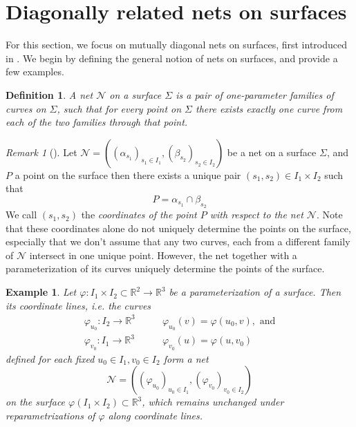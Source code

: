 \documentclass[10pt, a4paper]{article}
\theoremstyle{BoldTopSpacing}
\theoremstyle{BoldTopSpacing}
\theoremstyle{BoldTopSpacing}
\theoremstyle{BoldTopBottomSpacing}
\newtheorem{definition}{Definition}[section]
\theoremstyle{BoldTopSpacing}
\theoremstyle{BoldTopBottomSpacing}
\newtheorem{example}{Example}[section]
\theoremstyle{remark}
\newtheorem{remark}{\textit{Remark}}[section]
\begin{document}
\section{Diagonally related nets on surfaces}
\label{sec:diagonally-related-nets}

For this section, we focus on mutually diagonal nets on surfaces, first introduced in \cite{MutuallyDiagonalNets2019}. We begin by defining the general notion of nets on surfaces, and provide a few examples.

\begin{definition}
\label{def:nets-on-surfaces}
A net $\mathcal{N}$ on a surface $\Sigma$ is a pair of one-parameter families of curves on $\Sigma$, such that for every point on $\Sigma$ there exists exactly one curve from each of the two families through that point.
\end{definition}

\begin{remark}[]
\label{rm:label}
Let $\mathcal{N} = \left( (\alpha_{s_{1}})_{s_{1} \in I_1}, (\beta_{s_{2}})_{s_{2} \in I_2} \right)$ be a net on a surface
$\Sigma$, and $P$ a point on the surface then there exists a unique pair $(s_{1}, s_{2}) \in I_{1}\times I_{2}$ such that
\[
    P = \alpha_{s_1} \cap \beta_{s_2}
\]
We call $(s_1, s_2)$ the \textit{coordinates of the point $P$ with respect to the net $\mathcal{N}$}. Note that these coordinates alone do not uniquely determine the points on the surface, especially that we don't assume that any two curves, each from a different family of $\mathcal{N}$ intersect in one unique point. However, the net together with a parameterization of its curves uniquely determine the points of the surface.
\end{remark}

\begin{example}
\label{ex:coordinate-lines-form-net-on-surfaces}
Let $\varphi : I_{1} \times I_{2} \subset \mathbb{R}^2 \to \mathbb{R}^3$ be a parameterization of a surface. Then its
coordinate lines, i.e. the curves
\begin{align*}
    \varphi_{u_0} : I_{2} \to \mathbb{R}^3 &\quad \quad \varphi_{u_0}(v) = \varphi(u_0, v), \text{ and} \\
    \varphi_{v_0} : I_{1} \to \mathbb{R}^3 &\quad \quad \varphi_{v_0}(u) = \varphi(u, v_0)
\end{align*}
defined for each fixed $u_{0} \in I_1, v_{0} \in I_2$ form a net
\[
    \mathcal{N} = \left( (\varphi_{u_0})_{u_{0} \in I_1}, (\varphi_{v_0})_{v_{0} \in I_2} \right)
\]
on the surface $\varphi\left( I_1 \times I_{2} \right) \subset \mathbb{R}^3$, which remains unchanged under reparametrizations of $\varphi$ along coordinate lines.
\end{example}
\end{document}
